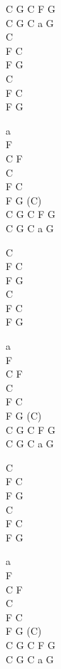 \begin{chord}
    C G C F G\\
    C G C a G\\
    C\\
    F C\\
    F G\\
    C\\
    F C\\
    F G

    a\\
    F\\
    C F\\
    C\\
    F C\\
    F G (C)\\
    C G C F G\\
    C G C a G

    C\\
    F C\\
    F G\\
    C\\
    F C\\
    F G
    
    a\\
    F\\
    C F\\
    C\\
    F C\\
    F G (C)\\
    C G C F G\\
    C G C a G

    C\\
    F C\\
    F G\\
    C\\
    F C\\
    F G
    
    a\\
    F\\
    C F\\
    C\\
    F C\\
    F G (C)\\
    C G C F G\\
    C G C a G
\end{chord}

